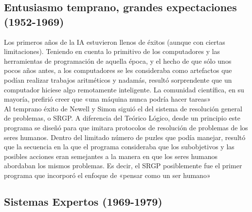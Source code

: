 \documentclass[12pt,a4paper]{report}
\begin{document}
\subsection*{Entusiasmo temprano, grandes expectaciones (1952-1969)}

Los primeros años de la IA estuvieron llenos de éxitos (aunque con ciertas limitaciones). Teniendo en cuenta lo primitivo de los computadores y las herramientas de programación de aquella época, y el hecho de que sólo unos pocos años antes, a los computadores se les consideraba como artefactos que podían realizar trabajos aritméticos y nadamás, resultó sorprendente que un computador hiciese algo remotamente inteligente. La comunidad científica, en su mayoría, prefirió creer que «una máquina nunca podría hacer tareas»\\Al temprano éxito de Newell y Simon siguió el del sistema de resolución general de problemas, o SRGP. A diferencia del Teórico Lógico, desde un principio este programa se diseñó para que imitara protocolos de resolución de problemas de los seres humanos. Dentro del limitado número de puzles que podía manejar, resultó que la secuencia en la que el programa consideraba que los subobjetivos y las posibles acciones eran semejantes a la manera en que los seres humanos abordaban los mismos problemas. Es decir, el SRGP posiblemente fue el primer programa que incorporó el enfoque de «pensar como un ser humano»
\subsection*{Sistemas Expertos (1969-1979)}
\end{document}
